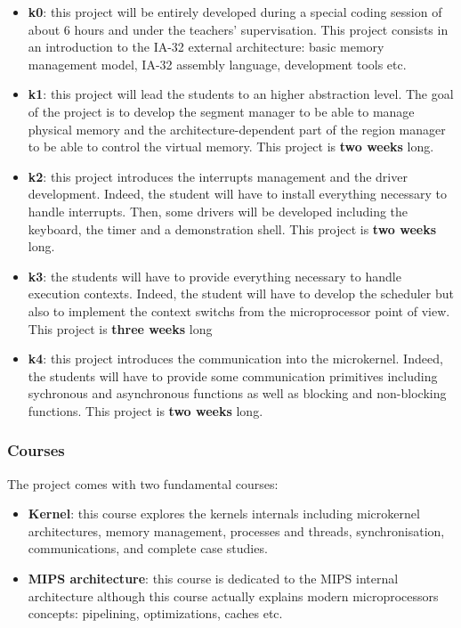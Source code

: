 \begin{multicols}{2}
\begin{itemize}
  \item
    \textbf{k0}: this project will be entirely developed during a
    special coding session of about 6 hours and under the teachers'
    supervisation. This project consists in an introduction to the
    IA-32 external architecture: basic memory management model,
    IA-32 assembly language, development tools etc.
  \item
    \textbf{k1}: this project will lead the students to an higher abstraction
    level. The goal of the project is to develop the segment manager to be
    able to manage physical memory and the architecture-dependent part of the
    region manager to be able to control the virtual memory. This project
    is \textbf{two weeks} long.
  \item
    \textbf{k2}: this project introduces the interrupts management and
    the driver development. Indeed, the student will have to install
    everything necessary to handle interrupts. Then, some drivers will
    be developed including the keyboard, the timer and a demonstration shell.
    This project is \textbf{two weeks} long.
  \item
    \textbf{k3}: the students will have to provide everything necessary
    to handle execution contexts. Indeed, the student will have to
    develop the scheduler but also to implement the context switchs from
    the microprocessor point of view. This project is \textbf{three weeks}
    long
  \item
    \textbf{k4}: this project introduces the communication into the
    microkernel. Indeed, the students will have to provide some
    communication primitives including sychronous and asynchronous
    functions as well as blocking and non-blocking functions. This project
    is \textbf{two weeks} long.
\end{itemize}


\subsubsection{Courses}

The project comes with two fundamental courses:

\begin{itemize}
  \item
    \textbf{Kernel}: this course explores the kernels internals including
    microkernel architectures, memory management, processes and threads,
    synchronisation, communications, and complete case studies.
  \item
    \textbf{MIPS architecture}: this course is dedicated to the MIPS internal
    architecture although this course actually explains modern microprocessors
    concepts: pipelining, optimizations, caches etc.
\end{itemize}


\end{multicols}

